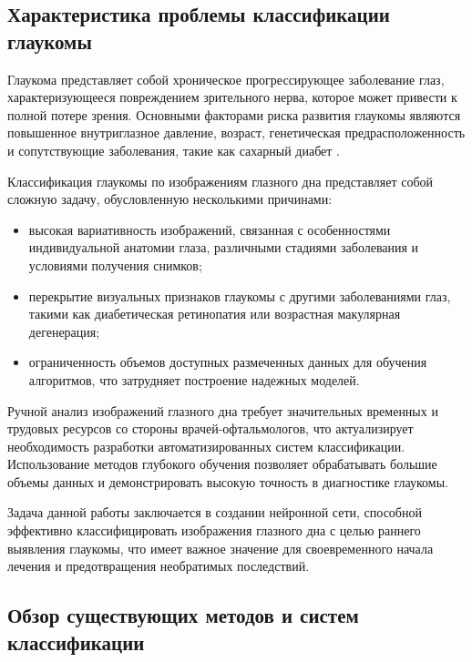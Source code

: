 {    \subsection{Характеристика проблемы классификации глаукомы}
    
        Глаукома представляет собой хроническое прогрессирующее заболевание глаз, характеризующееся повреждением зрительного нерва, которое может привести к полной потере зрения. Основными факторами риска развития глаукомы являются повышенное внутриглазное давление, возраст, генетическая предрасположенность и сопутствующие заболевания, такие как сахарный диабет \cite{glaucoma_review}.
        
        Классификация глаукомы по изображениям глазного дна представляет собой сложную задачу, обусловленную несколькими причинами:
        \begin{itemize}
            \item высокая вариативность изображений, связанная с особенностями индивидуальной анатомии глаза, различными стадиями заболевания и условиями получения снимков;
            \item перекрытие визуальных признаков глаукомы с другими заболеваниями глаз, такими как диабетическая ретинопатия или возрастная макулярная дегенерация;
            \item ограниченность объемов доступных размеченных данных для обучения алгоритмов, что затрудняет построение надежных моделей.
        \end{itemize}
        
        Ручной анализ изображений глазного дна требует значительных временных и трудовых ресурсов со стороны врачей-офтальмологов, что актуализирует необходимость разработки автоматизированных систем классификации. Использование методов глубокого обучения позволяет обрабатывать большие объемы данных и демонстрировать высокую точность в диагностике глаукомы.
        
        Задача данной работы заключается в создании нейронной сети, способной эффективно классифицировать изображения глазного дна с целью раннего выявления глаукомы, что имеет важное значение для своевременного начала лечения и предотвращения необратимых последствий.
\newpage

    \subsection{Обзор существующих методов и систем классификации}

}
